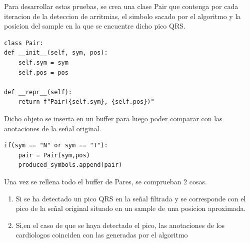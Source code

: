Para desarrollar estas pruebas, se crea una clase Pair que contenga por cada iteracion de la deteccion de arritmias, el simbolo sacado 
por el algoritmo y la posicion del sample en la que se encuentre dicho pico QRS.

\lstset{language=python, breaklines=true, basicstyle=\footnotesize}
\begin{lstlisting}[frame=single]
class Pair:
def __init__(self, sym, pos):
    self.sym = sym
    self.pos = pos

def __repr__(self):
    return f"Pair({self.sym}, {self.pos})"

\end{lstlisting}

Dicho objeto se inserta en un buffer para luego poder comparar con las anotaciones de la señal original.

\lstset{language=python, breaklines=true, basicstyle=\footnotesize}
\begin{lstlisting}[frame=single]
if(sym == "N" or sym == "T"):
    pair = Pair(sym,pos)    
    produced_symbols.append(pair)
\end{lstlisting}

Una vez se rellena todo el buffer de Pares, se comprueban 2 cosas.
\begin{enumerate}
	\item Si se ha detectado un pico QRS en la señal filtrada y se
     corresponde con el pico de la señal original situado en un sample de una posicion aproximada.
	\item Si,en el caso de que se haya detectado el pico, las anotaciones de los cardiologos coinciden
     con las generadas por el algoritmo
\end{enumerate} 

